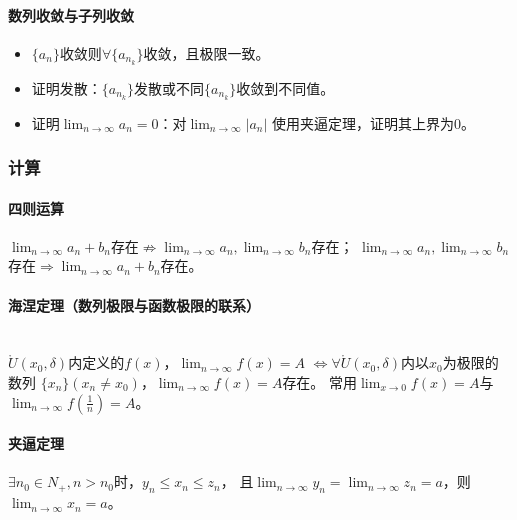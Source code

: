 \documentclass[
12pt, %
a4paper, 
oneside, %
headinclude,footinclude, %
]{scrartcl}
\begin{document}
\paragraph{数列收敛与子列收敛}
\begin{itemize}
\item $ \{a_n\} $收敛则$ \forall \{a_{n_k}\} $收敛，且极限一致。
\item 证明发散：$ \{a_{n_k}\} $发散或不同$ \{a_{n_k}\} $收敛到不同值。
\item 证明$ \lim_{n \to \infty} a_n = 0 $：对$ \lim_{n \to \infty} |a_n| $
使用夹逼定理，证明其上界为$ 0 $。
\end{itemize}
\subsubsection{计算}
\paragraph{四则运算}
$ \lim_{n \to \infty} a_n + b_n $存在$ \nRightarrow $$ \lim_{n \to \infty} a_n, \lim_{n \to \infty} b_n $存在；
$ \lim_{n \to \infty} a_n, \lim_{n \to \infty} b_n $存在$ \Rightarrow $$ \lim_{n \to \infty} a_n + b_n $存在。
\paragraph{海涅定理（数列极限与函数极限的联系）}~\\

$ \mathring{U}(x_0, \delta) $内定义的$ f(x) $，$ \lim_{n \to \infty} f(x) = A $
$ \Leftrightarrow $$ \forall \mathring{U}(x_0, \delta) $内以$ x_0 $为极限的数列
$ \{x_n\}(x_n \neq x_0) $，$ \lim_{n \to \infty} f(x) = A $存在。
常用$ \lim_{x \to 0} f(x) = A $与$ \lim_{n \to \infty} f(\frac{1}{n}) = A $。
\paragraph{夹逼定理}
$ \exists n_0 \in N_+, n > n_0 $时，$ y_n \leq x_n \leq z_n $，
且$ \lim_{n \to \infty} y_n = \lim_{n \to \infty} z_n = a $，则$ \lim_{n \to \infty} x_n = a $。
\end{document}
